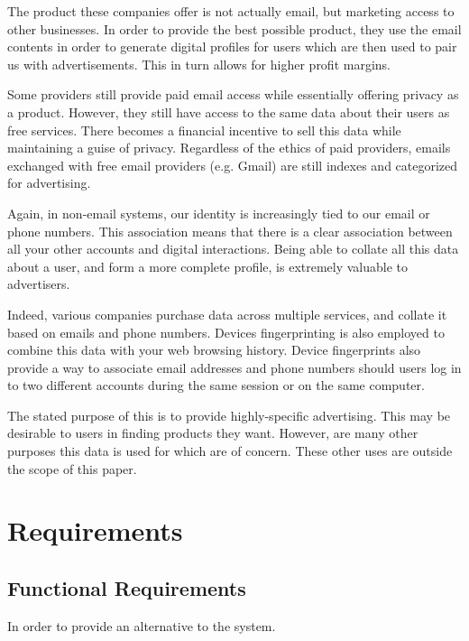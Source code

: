 \documentclass{article}
\theoremstyle{definition}
\begin{document}
The product these companies offer is not actually email, but marketing access to other businesses. In order to provide the best possible product, they use the email contents in order to generate digital profiles for users which are then used to pair us with advertisements. This in turn allows for higher profit margins.

Some providers still provide paid email access while essentially offering privacy as a product. However, they still have access to the same data about their users as free services. There becomes a financial incentive to sell this data while maintaining a guise of privacy. Regardless of the ethics of paid providers, emails exchanged with free email providers (e.g. Gmail) are still indexes and categorized for advertising.

Again, in non-email systems, our identity is increasingly tied to our email or phone numbers. This association means that there is a clear association between all your other accounts and digital interactions. Being able to collate all this data about a user, and form a more complete profile, is extremely valuable to advertisers.

Indeed, various companies purchase data across multiple services, and collate it based on emails and phone numbers. Devices fingerprinting is also employed to combine this data with your web browsing history. Device fingerprints also provide a way to associate email addresses and phone numbers should users log in to two different accounts during the same session or on the same computer.

The stated purpose of this is to provide highly-specific advertising. This may be desirable to users in finding products they want. However, are many other purposes this data is used for which are of concern. These other uses are outside the scope of this paper.
\section{Requirements}

\subsection{Functional Requirements}

In order to provide an alternative to the system.
\end{document}
